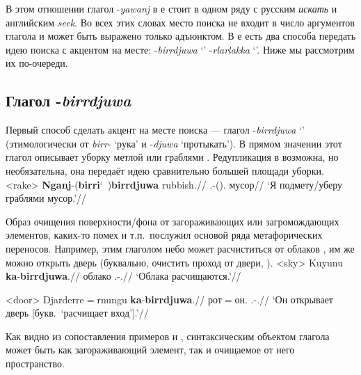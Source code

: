 В этом отношении глагол -\textit{yawanj} в  е стоит в одном ряду с русским \textit{искать} и английским \textit{seek}. Во всех этих словах место поиска не входит в число аргументов глагола и может быть выражено только адъюнктом. В  е есть два способа передать идею поиска с акцентом на месте: -\textit{birrdjuwa} `\bdj' -\textit{rlarlakka} `\rlk'. Ниже мы рассмотрим их по-очереди.

\subsection{Глагол -\textit{birrdjuwa}}
\label{sec:bdj}
Первый способ сделать акцент на месте поиска --- глагол -\textit{birrdjuwa} `\bdj' (этимологически от \textit{birr}- `рука' и -\textit{djuwa} `протыкать'). В прямом значении этот глагол описывает уборку метлой или граблями . Редупликация в  возможна, но необязательна, она передаёт идею сравнительно большей площади уборки.
\ex<rake>\begingl
\gla \textbf{Nganj}-(\textbf{birri}\char`~)\textbf{birrdjuwa} rubbish.//
\glb \Fsg.\Fut-(\rdp)\bdj.\Np{} мусор//
\glft `Я подмету/уберу граблями мусор.'//%
\endgl\xe

Образ очищения поверхности/фона от загораживающих или загромождающих элементов, каких-то помех и т.п.\ послужил основой ряда метафорических переносов. Например, этим глаголом небо может расчиститься от облаков , им же можно открыть дверь (буквально, очистить проход от двери, ).
\ex<sky>\begingl
\gla Kuyunu \textbf{ka}-\textbf{birrdjuwa}.//
\glb облако \Tsg.\Real-\bdj.\Np{}//
\glft `Облака расчищаются.'//
\endgl\xe

\ex<door>\begingl
\gla Djarderre$=$rnungu \textbf{ka}-\textbf{birrdjuwa}.//
\glb рот$=$он.\Gen{} \Tsg.\Real-\bdj.\Np{}//
\glft `Он открывает дверь [букв.\ `расчищает вход'].'//
\endgl\xe

Как видно из сопоставления примеров  и , синтаксическим объектом глагола может быть как загораживающий элемент, так и очищаемое от него пространство.

